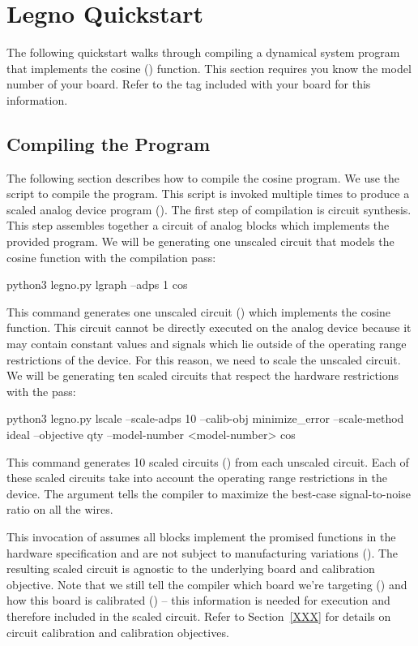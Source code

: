 \chapter{Legno Quickstart}

The following quickstart walks through compiling a dynamical system program that
implements the cosine () function. This section requires you know the
model number of your board. Refer to the tag included with your board for this
information.


\section{Compiling the  Program}

The following section describes how to compile the cosine program. We use the
 script to compile the program. This script  is invoked multiple
times to produce a scaled analog device program (). The first step of
compilation is circuit synthesis. This step assembles together a circuit of
analog blocks which implements the provided program. We will be generating one
unscaled circuit that models the cosine function with the 
compilation pass:

\begin{snippet}
  python3 legno.py lgraph --adps 1 cos
\end{snippet}

This command generates one unscaled circuit () which implements
the cosine function. This circuit cannot be directly executed on the analog
device because it may contain constant values and signals which lie outside of
the operating range restrictions of the device. For this reason, we need to
scale the unscaled circuit. We will be generating ten scaled circuits that
respect the hardware restrictions with the  pass:

\begin{snippet}
  python3 legno.py lscale --scale-adps 10 --calib-obj minimize_error
  --scale-method ideal --objective qty --model-number <model-number> cos
\end{snippet}

This command generates 10 scaled circuits () from each
unscaled circuit. Each of these scaled circuits take into account the operating
range restrictions in the device. The  argument tells the
compiler to maximize the best-case signal-to-noise ratio on all the wires.

This invocation of  assumes all blocks implement the promised
functions in the hardware specification and are not subject to manufacturing variations (). The
resulting scaled circuit is agnostic to the underlying board and calibration
objective. Note that we still tell the compiler which board we're targeting
() and how this board is calibrated
() -- this information is needed for execution
and therefore included in the scaled circuit. Refer to Section~\ref{XXX} for
details on circuit calibration and calibration objectives.

